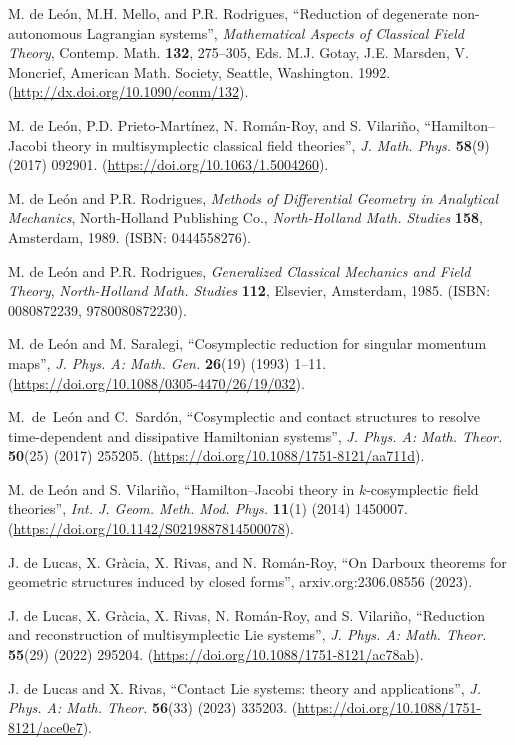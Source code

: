 \documentclass[12pt]{report}
\begin{document}
\begin{thebibliography}{999}
M. de Le\'on, M.H. Mello, and P.R. Rodrigues,
``Reduction of degenerate non-autonomous Lagrangian systems'',
{\sl Mathematical Aspects of Classical Field Theory},
Contemp. Math. {\bf 132}, 275--305,
Eds. M.J. Gotay, J.E. Marsden, V. Moncrief,
American Math. Society, Seattle, Washington. 1992.
(\url{http://dx.doi.org/10.1090/conm/132}).

M. de Le\'on, P.D. Prieto-Mart\'inez, N. Rom\'an-Roy, and S. Vilari\~no,
``Hamilton--Jacobi theory in multisymplectic classical field theories'',
{\sl J. Math. Phys.} {\bf 58}(9) (2017) 092901.
(\url{https://doi.org/10.1063/1.5004260}).

M. de Le\'on and P.R. Rodrigues,
{\it Methods of Differential Geometry in Analytical Mechanics},
North-Holland Publishing Co.,
{\sl North-Holland Math. Studies} {\bf 158},
 Amsterdam, 1989.
(ISBN: 0444558276).

M. de Le\'on and P.R. Rodrigues,
{\it Generalized Classical Mechanics and Field Theory},
{\sl North-Holland Math. Studies} {\bf 112},
Elsevier, Amsterdam, 1985.
(ISBN: 0080872239, 9780080872230).

M. de Le\'on and M. Saralegi,
``Cosymplectic reduction for singular momentum maps'',
{\sl J. Phys. A: Math. Gen.} {\bf 26}(19) (1993) 1--11.
(\url{https://doi.org/10.1088/0305-4470/26/19/032}).

M.~de~Le{\'{o}}n and C.~Sard{\'{o}}n,
``Cosymplectic and contact structures to resolve time-dependent and dissipative Hamiltonian systems'',
{\sl J. Phys. A: Math. Theor.} {\bf 50}(25) (2017) 255205.
(\url{https://doi.org/10.1088/1751-8121/aa711d}).

{\rm M. de Le\'on and S. Vilari\~{n}o},
``Hamilton--Jacobi theory in $k$-cosymplectic field theories'',
\textsl{Int. J. Geom. Meth. Mod. Phys.} \textbf{11}(1) (2014) 1450007.
(\url{https://doi.org/10.1142/S0219887814500078}).

J. de Lucas, X. Gr\`acia, X. Rivas, and N. Rom\'an-Roy,
``On Darboux theorems for geometric structures induced by closed forms'',
arxiv.org:2306.08556 (2023).

J. de Lucas, X. Gr\`acia, X. Rivas, N. Rom\'an-Roy, and S. Vilari\~no,
``Reduction and reconstruction of multisymplectic Lie systems'',
{\sl J. Phys. A: Math. Theor.} {\bf 55}(29) (2022) 295204.
(\url{https://doi.org/10.1088/1751-8121/ac78ab}).

J. de Lucas and X. Rivas, 
``Contact Lie systems: theory and applications'', 
{\sl J. Phys. A: Math. Theor.} {\bf 56}(33) (2023) 335203.
(\url{https://doi.org/10.1088/1751-8121/ace0e7}).


\end{thebibliography}
\end{document}

